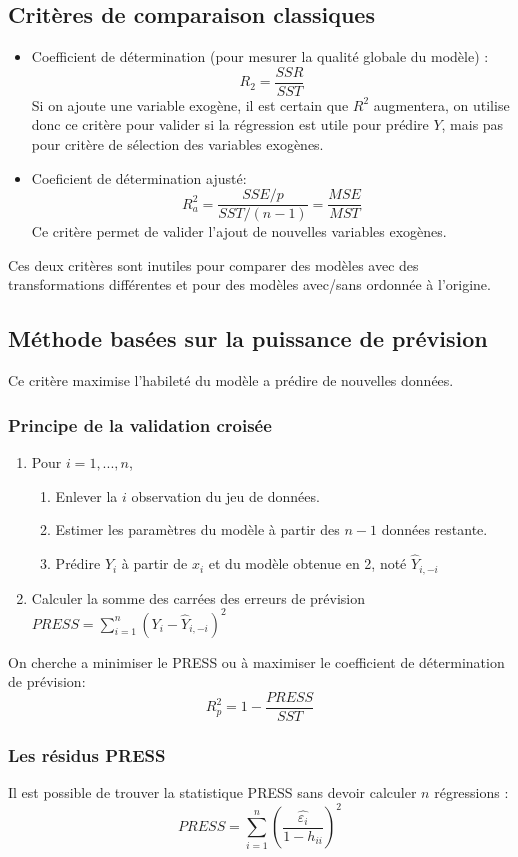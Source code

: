 \documentclass[10pt, french]{article}
\begin{document}
\begin{multicols*}{3}
\subsection*{Critères de comparaison classiques}
\begin{itemize}
	\item Coefficient de détermination (pour mesurer la qualité globale du modèle) :
	\[ R_2 = \frac{SSR}{SST} \]
	Si on ajoute une variable exogène, il est certain que $R^2$ augmentera, on utilise donc ce critère pour valider si la régression est utile pour prédire $Y$, mais pas pour critère de sélection des variables exogènes.
	\item Coeficient de détermination ajusté:
	\[ R_a^2 = \frac{SSE / p}{SST / (n-1)} = \frac{MSE}{MST} \]
	Ce critère permet de valider l'ajout de nouvelles variables exogènes.
\end{itemize}
Ces deux critères sont inutiles pour comparer des modèles avec des transformations différentes et pour des modèles avec/sans ordonnée à l'origine.

\subsection*{Méthode basées sur la puissance de prévision}
Ce critère maximise l'habileté du modèle a prédire de nouvelles données.
\subsubsection*{Principe de la validation croisée}
\begin{enumerate}
\item Pour $i = 1, ..., n$,
\begin{enumerate}[label=1.\arabic*]
	\item Enlever la $i$ observation du jeu de données.
	\item Estimer les paramètres du modèle à partir des $n - 1$ données restante.
	\item Prédire $Y_i$ à partir de $x_i$ et du modèle obtenue en 2, noté $\hat{Y}_{i,-i}$
\end{enumerate}
\item Calculer la somme des carrées des erreurs de prévision $PRESS = \sum_{i=1}^n (Y_i - \hat{Y}_{i,-i})^2$
\end{enumerate}
	On cherche a minimiser le PRESS ou à maximiser le coefficient de détermination de prévision:
	\[ R_p^2 = 1 - \frac{PRESS}{SST} \]
\subsubsection*{Les résidus PRESS}
	Il est possible de trouver la statistique PRESS sans devoir calculer $n$ régressions :
	\[ PRESS = \sum_{i=1}^n \left( \frac{\hat{\varepsilon_i}}{1 - h_{ii}} \right)^2 \]

\end{multicols*}
\end{document}
